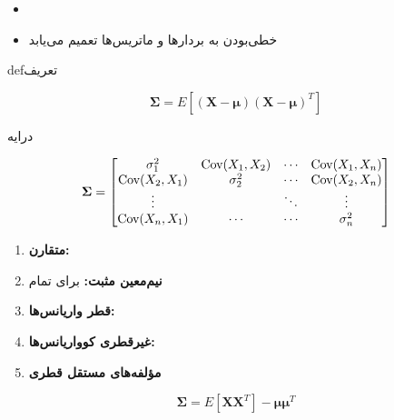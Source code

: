 
\begin{itemize}
\tightlist
\item
\item
  خطی‌بودن به بردارها و ماتریس‌ها تعمیم می‌یابد
\end{itemize}


\begin{PSbox}[unbreakable]{def}{تعریف}

\[\boldsymbol{\Sigma} = E[(\mathbf{X} - \boldsymbol{\mu})(\mathbf{X} - \boldsymbol{\mu})^T]\]

درایه 

\[\boldsymbol{\Sigma} = \begin{bmatrix} \sigma_1^2 & \text{Cov}(X_1,X_2) & \cdots & \text{Cov}(X_1,X_n) \\ \text{Cov}(X_2,X_1) & \sigma_2^2 & \cdots & \text{Cov}(X_2,X_n) \\ \vdots & & \ddots & \vdots \\ \text{Cov}(X_n,X_1) & \cdots & \cdots & \sigma_n^2 \end{bmatrix}\]

\end{PSbox}


\begin{enumerate}
\def\labelenumi{\arabic{enumi}.}
\tightlist
\item
  \textbf{متقارن:} 
\item
  \textbf{نیم‌معین مثبت:}  برای تمام 
\item
  \textbf{قطر \lr{=} واریانس‌ها:} 
\item
  \textbf{غیرقطری \lr{=} کوواریانس‌ها:} 
\item
  \textbf{مؤلفه‌های مستقل \lr{\ensuremath{\to} \ensuremath{\Sigma}} قطری}
\end{enumerate}


\[\boldsymbol{\Sigma} = E[\mathbf{X}\mathbf{X}^T] - \boldsymbol{\mu}\boldsymbol{\mu}^T\]

